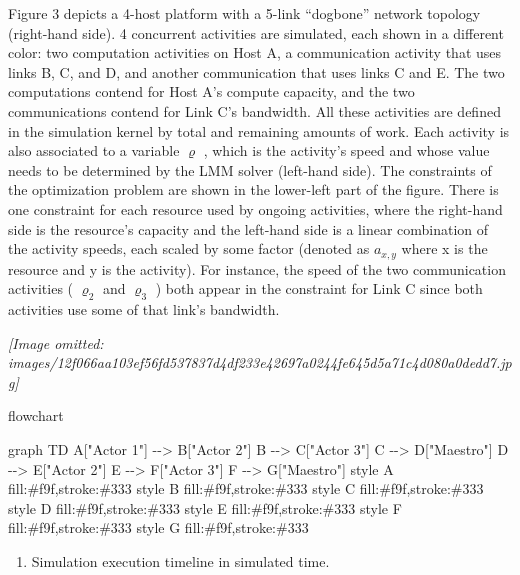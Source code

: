 \documentclass[
]{article}
\newenvironment{Shaded}{}{}
\newcommand{\NormalTok}[1]{#1}
\providecommand{\tightlist}{%
  \setlength{\itemsep}{0pt}\setlength{\parskip}{0pt}}
\begin{document}
Figure 3 depicts a 4-host platform with a 5-link ``dogbone'' network
topology (right-hand side). 4 concurrent activities are simulated, each
shown in a different color: two computation activities on Host A, a
communication activity that uses links B, C, and D, and another
communication that uses links C and E. The two computations contend for
Host A's compute capacity, and the two communications contend for Link
C's bandwidth. All these activities are defined in the simulation kernel
by total and remaining amounts of work. Each activity is also associated
to a variable \(\varrho\) , which is the activity's speed and whose
value needs to be determined by the LMM solver (left-hand side). The
constraints of the optimization problem are shown in the lower-left part
of the figure. There is one constraint for each resource used by ongoing
activities, where the right-hand side is the resource's capacity and the
left-hand side is a linear combination of the activity speeds, each
scaled by some factor (denoted as \(a_{x,y}\) where x is the resource
and y is the activity). For instance, the speed of the two communication
activities ( \(\varrho_{2}\) and \(\varrho_{3}\) ) both appear in the
constraint for Link C since both activities use some of that link's
bandwidth.

\textit{[Image omitted: images/12f066aa103ef56fd537837d4df233e42697a0244fe645d5a71c4d080a0dedd7.jpg]}

flowchart

\begin{Shaded}
\begin{Highlighting}[]
\NormalTok{graph TD}
\NormalTok{    A["Actor 1"] {-}{-}\textgreater{} B["Actor 2"]}
\NormalTok{    B {-}{-}\textgreater{} C["Actor 3"]}
\NormalTok{    C {-}{-}\textgreater{} D["Maestro"]}
\NormalTok{    D {-}{-}\textgreater{} E["Actor 2"]}
\NormalTok{    E {-}{-}\textgreater{} F["Actor 3"]}
\NormalTok{    F {-}{-}\textgreater{} G["Maestro"]}
\NormalTok{    style A fill:\#f9f,stroke:\#333}
\NormalTok{    style B fill:\#f9f,stroke:\#333}
\NormalTok{    style C fill:\#f9f,stroke:\#333}
\NormalTok{    style D fill:\#f9f,stroke:\#333}
\NormalTok{    style E fill:\#f9f,stroke:\#333}
\NormalTok{    style F fill:\#f9f,stroke:\#333}
\NormalTok{    style G fill:\#f9f,stroke:\#333}
\end{Highlighting}
\end{Shaded}

\begin{enumerate}
\def\labelenumi{(\alph{enumi})}
\tightlist
\item
  Simulation execution timeline in simulated time.
\end{enumerate}
\end{document}
